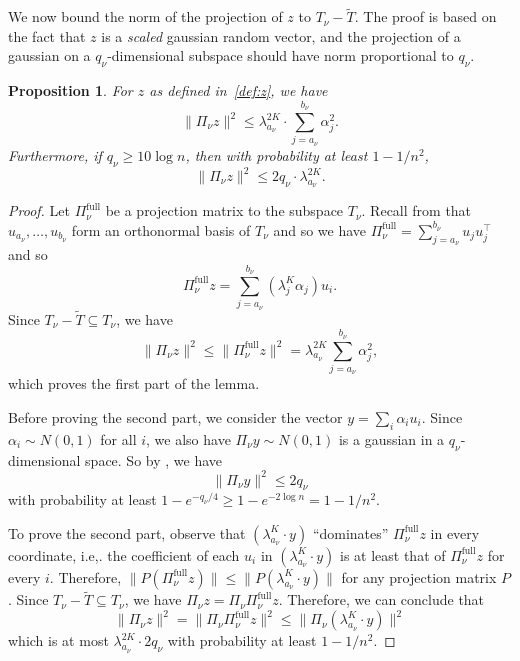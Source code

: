 \documentclass[11pt]{article}
\newtheorem{proposition}[theorem]{Proposition}
\newcommand\uu{\boldsymbol{\mathit{u}}}
\newcommand\yy{\boldsymbol{\mathit{y}}}
\newcommand\zz{\boldsymbol{\mathit{z}}}
\newcommand\PP{\boldsymbol{\mathit{P}}}
\newcommand\Ttil{{\tilde{\mathit{T}}}}
\begin{document}
We now bound the norm of the projection of $\zz$ to $T_\nu - \Ttil$. The proof is based on the fact that $\zz$ is a {\it scaled} gaussian random vector, and the projection of a gaussian on a $q_{\nu}$-dimensional subspace should have norm proportional to $q_{\nu}$. 
\begin{proposition}\label{lem:projZ}
For $\zz$ as defined in~\eqref{def:z}, we have
\[
\|\Pi_{\nu}\zz\|^2 \leq \lambda_{a_{\nu}}^{2K} \cdot \sum_{j=a_{\nu}}^{b_{\nu}}\alpha_j^2.
\] 
Furthermore, if $q_{\nu}\geq 10 \log n$, then with probability at least $1-1/n^2$,
\[
\|\Pi_{\nu}\zz\|^2 \leq 2q_{\nu}\cdot \lambda_{a_{\nu}}^{2K}.
\]
\end{proposition}
\begin{proof}
Let $\Pi_{\nu}^{\text{full}}$ be a projection matrix to the subspace $T_{\nu}$. Recall from  that $\uu_{a_{\nu}},\dots,\uu_{b_{\nu}}$ form an orthonormal basis of $T_\nu$ and so we have $\Pi_{\nu}^{\text{full}}=\sum_{j=a_{\nu}}^{b_{\nu}}\uu_{j}\uu_{j}^{\top}$ and so $$\Pi_{\nu}^{\text{full}}\zz=\sum_{j=a_{\nu}}^{b_{\nu}}(\lambda_{j}^{K}\alpha_{j})\uu_{i}.$$ Since $T_{\nu}-\Ttil\subseteq T_{\nu}$, we have 
\[
\|\Pi_{\nu}\zz\|^{2}\le\|\Pi_{\nu}^{\text{full}}\zz\|^{2} = \lambda_{a_{\nu}}^{2K}\sum_{j=a_{\nu}}^{b_{\nu}}\alpha_{j}^{2},
\]
which proves the first part of the lemma. 

Before proving the second part, we consider the vector $\yy=\sum_{i}\alpha_{i}\uu_{i}$. Since $\alpha_{i}\sim N(0,1)$ for all $i$, we also have $\Pi_{\nu}\yy\sim N(0,1)$ is a gaussian in a $q_{\nu}$-dimensional space. So by , we have
\[
\|\Pi_{\nu}\yy\|^{2}\le2q_{\nu}
\]
with probability at least $1-e^{-q_{\nu}/4}\ge1-e^{-2\log n}=1-1/n^{2}$. 

To prove the second part, observe that $(\lambda_{a_{\nu}}^{K}\cdot\yy)$ ``dominates'' $\Pi_{\nu}^{\text{full}}\zz$ in every coordinate, i.e,. the coefficient of each $\uu_{i}$ in $(\lambda_{a_{\nu}}^{K}\cdot\yy)$ is at least that of $\Pi_{\nu}^{\text{full}}\zz$ for every $i$. Therefore, $\|\PP(\Pi_{\nu}^{\text{full}}\zz)\|\le\|\PP(\lambda_{a_{\nu}}^{K}\cdot\yy)\|$ for any projection matrix $\PP$. Since $T_{\nu}-\Ttil\subseteq T_{\nu}$, we have $\Pi_{\nu}\zz=\Pi_{\nu}\Pi_{\nu}^{\text{full}}\zz$. Therefore, we can conclude that 
\[
\|\Pi_{\nu}\zz\|^{2}=\|\Pi_{\nu}\Pi_{\nu}^{\text{full}}\zz\|^{2}\le\|\Pi_{\nu}(\lambda_{a_{\nu}}^{K}\cdot\yy)\|^{2}
\]
which is at most $\lambda_{a_{\nu}}^{2K}\cdot2q_{\nu}$ with probability at least $1-1/n^{2}$. \qedhere
\end{proof}
\end{document}
